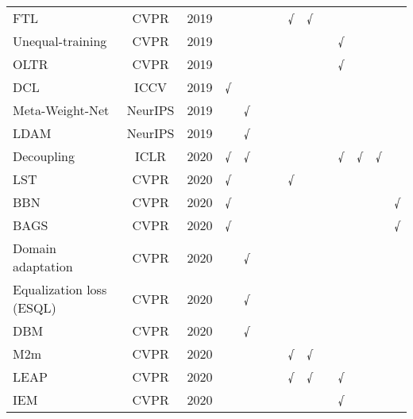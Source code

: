 \begin{table*}[htbp]
{\begin{tabular}{lccccccccccccc}
FTL \cite{Yin_2019}  & CVPR  & 2019  &       &       &       &       & √     & √     &       &       &       &       &  \\
Unequal-training \cite{Zhong_2019}  & CVPR  & 2019  &       &       &       &       &       &       &       & √     &       &       &  \\
OLTR \cite{Liu_2019}  & CVPR  & 2019  &       &       &       &       &       &       &       & √     &       &       &  \\
DCL \cite{Wang_2019}  & ICCV  & 2019  & √     &       &       &       &       &       &       &       &       &       &  \\
Meta-Weight-Net \cite{shu2019meta}  & NeurIPS & 2019  &       & √     &       &       &       &       &       &       &       &       &  \\
LDAM \cite{cao2019learning}  & NeurIPS & 2019  &       & √     &       &       &       &       &       &       &       &       &  \\
Decoupling \cite{kang2019decoupling}  & ICLR  & 2020  & √     & √     &       &       &       &       &       & √     & √     & √     &  \\
LST \cite{Hu_2020}  & CVPR  & 2020  & √     &       &       &       & √     &       &       &       &       &       &  \\
BBN \cite{Zhou_2020}  & CVPR  & 2020  & √     &       &       &       &       &       &       &       &       &       & √ \\
BAGS \cite{Li_2020}  & CVPR  & 2020  & √     &       &       &       &       &       &       &       &       &       & √ \\
Domain adaptation \cite{Jamal_2020}  & CVPR  & 2020  &       & √     &       &       &       &       &       &       &       &       &  \\
Equalization loss (ESQL) \cite{Tan_2020}  & CVPR  & 2020  &       & √     &       &       &       &       &       &       &       &       &  \\
DBM \cite{Cao_2020}  & CVPR  & 2020  &       & √     &       &       &       &       &       &       &       &       &  \\
M2m \cite{Kim_2020_m2m}  & CVPR  & 2020  &       &       &       &       & √     & √     &       &       &       &       &  \\
LEAP \cite{Liu_2020}  & CVPR  & 2020  &       &       &       &       & √     & √     &       & √     &       &       &  \\
IEM \cite{Zhu_2020} & CVPR  & 2020  &       &       &       &       &       &       &       & √     &       &       &  \\

\end{tabular}}
\end{table*}
